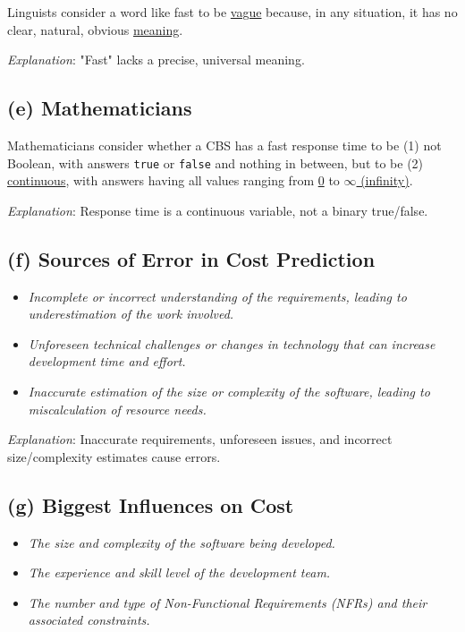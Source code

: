 \documentclass{article}
\begin{document}
Linguists consider a word like fast to be \underline{vague} because, in any situation, it has no clear, natural, obvious \underline{meaning}.

\textit{Explanation}: "Fast" lacks a precise, universal meaning.

\subsection*{(e) Mathematicians}

Mathematicians consider whether a CBS has a fast response time to be (1) not Boolean, with answers \texttt{true} or \texttt{false} and nothing in between, but to be (2) \underline{continuous}, with answers having all values ranging from \underline{0} to \underline{$\infty$ (infinity)}.

\textit{Explanation}: Response time is a continuous variable, not a binary true/false.

\subsection*{(f) Sources of Error in Cost Prediction}

\begin{itemize}
    \item \textit{Incomplete or incorrect understanding of the requirements, leading to underestimation of the work involved.}
    \item \textit{Unforeseen technical challenges or changes in technology that can increase development time and effort.}
    \item \textit{Inaccurate estimation of the size or complexity of the software, leading to miscalculation of resource needs.}
\end{itemize}

\textit{Explanation}: Inaccurate requirements, unforeseen issues, and incorrect size/complexity estimates cause errors.

\subsection*{(g) Biggest Influences on Cost}

\begin{itemize}
    \item \textit{The size and complexity of the software being developed.}
    \item \textit{The experience and skill level of the development team.}
    \item \textit{The number and type of Non-Functional Requirements (NFRs) and their associated constraints.}
\end{itemize}
\end{document}
